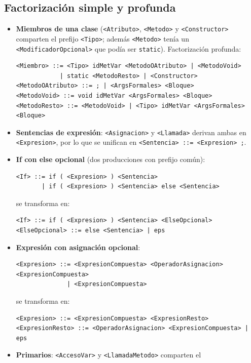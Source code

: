 \documentclass[11pt,a4paper]{article}
\begin{document}
\subsection{Factorización simple y profunda}

\begin{itemize}
  \item \textbf{Miembros de una clase} (\texttt{<Atributo>}, \texttt{<Metodo>} y
        \texttt{<Constructor>} comparten el prefijo \texttt{<Tipo>}; además
        \texttt{<Metodo>} tenía un \texttt{<ModificadorOpcional>} que podía ser
        \texttt{static}). Factorización profunda:
{\footnotesize
\begin{verbatim}
<Miembro> ::= <Tipo> idMetVar <MetodoOAtributo> | <MetodoVoid>
            | static <MetodoResto> | <Constructor>
<MetodoOAtributo> ::= ; | <ArgsFormales> <Bloque>
<MetodoVoid> ::= void idMetVar <ArgsFormales> <Bloque>
<MetodoResto> ::= <MetodoVoid> | <Tipo> idMetVar <ArgsFormales> <Bloque>
\end{verbatim}}
  \item \textbf{Sentencias de expresión}: \texttt{<Asignacion>} y \texttt{<Llamada>} derivan
        ambas en \texttt{<Expresion>}, por lo que se unifican en
        \texttt{<Sentencia> ::= <Expresion> ;}.
  \item \textbf{If con else opcional} (dos producciones con prefijo común):
{\footnotesize
\begin{verbatim}
<If> ::= if ( <Expresion> ) <Sentencia>
       | if ( <Expresion> ) <Sentencia> else <Sentencia>
\end{verbatim}}
        se transforma en:
{\footnotesize
\begin{verbatim}
<If> ::= if ( <Expresion> ) <Sentencia> <ElseOpcional>
<ElseOpcional> ::= else <Sentencia> | eps
\end{verbatim}}
  \item \textbf{Expresión con asignación opcional}:
{\footnotesize
\begin{verbatim}
<Expresion> ::= <ExpresionCompuesta> <OperadorAsignacion> <ExpresionCompuesta>
              | <ExpresionCompuesta>
\end{verbatim}}
        se transforma en:
{\footnotesize
\begin{verbatim}
<Expresion> ::= <ExpresionCompuesta> <ExpresionResto>
<ExpresionResto> ::= <OperadorAsignacion> <ExpresionCompuesta> | eps
\end{verbatim}}
  \item \textbf{Primarios}: \texttt{<AccesoVar>} y \texttt{<LlamadaMetodo>} comparten el

\end{itemize}
\end{document}
